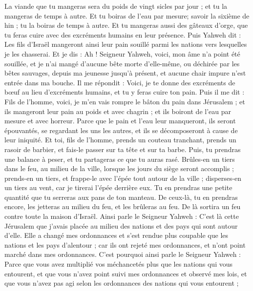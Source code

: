 \begin{multicols}{2}
La viande que tu mangeras sera du poids de vingt sicles par jour ; et tu la mangeras de temps à autre.
Et tu boiras de l'eau par mesure; savoir la sixième de hin ; tu la boiras de temps à autre.
Et tu mangeras aussi des gâteaux d'orge, que tu feras cuire avec des excréments humains en leur présence.
Puis Yahweh dit : Les fils d'Israël mangeront ainsi leur pain souillé parmi les nations vers lesquelles je les chasserai.
Et je dis : Ah ! Seigneur Yahweh, voici, mon âme n'a point été souillée, et je n'ai mangé d'aucune bête morte d'elle-même, ou déchirée par les bêtes sauvages, depuis ma jeunesse jusqu'à présent, et aucune chair impure n'est entrée dans ma bouche.
Il me répondit : Voici, je te donne des excréments de bœuf au lieu d'excréments humains, et tu y feras cuire ton pain.
Puis il me dit : Fils de l'homme, voici, je m'en vais rompre le bâton du pain dans Jérusalem ; et ils mangeront leur pain au poids et avec chagrin ; et ils boiront de l'eau par mesure et avec horreur.
Parce que le pain et l'eau leur manqueront, ils seront épouvantés, se regardant les uns les autres, et ils se décomposeront à cause de leur iniquité.
\VerseOne{}Et toi, fils de l'homme, prends un couteau tranchant, prends un rasoir de barbier, et fais-le passer sur ta tête et sur ta barbe. Puis, tu prendras une balance à peser, et tu partageras ce que tu auras rasé.
Brûles-en un tiers dans le feu, au milieu de la ville, lorsque les jours du siège seront accomplis ; prends-en un tiers, et frappe-le avec l'épée tout autour de la ville ; disperses-en un tiers au vent, car je tirerai l'épée derrière eux.
Tu en prendras une petite quantité que tu serreras aux pans de ton manteau.
De ceux-là, tu en prendras encore, les jetteras au milieu du feu, et les brûleras au feu. De là sortira un feu contre toute la maison d'Israël.
Ainsi parle le Seigneur Yahweh : C'est là cette Jérusalem que j'avais placée au milieu des nations et des pays qui sont autour d'elle.
Elle a changé mes ordonnances et s'est rendue plus coupable que les nations et les pays d'alentour ; car ils ont rejeté mes ordonnances, et n'ont point marché dans mes ordonnances.
C'est pourquoi ainsi parle le Seigneur Yahweh : Parce que vous avez multiplié vos méchancetés plus que les nations qui vous entourent, et que vous n'avez point suivi mes ordonnances et observé mes lois, et que vous n'avez pas agi selon les ordonnances des nations qui vous entourent ;

\end{multicols}
